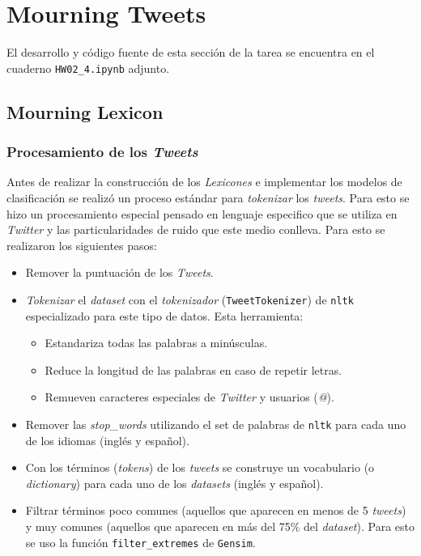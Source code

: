 \newpage

\section{Mourning Tweets}

El desarrollo y código fuente de esta sección de la tarea se encuentra en el cuaderno \texttt{HW02\_4.ipynb} adjunto.

\subsection{Mourning Lexicon}

\subsubsection{Procesamiento de los \textit{Tweets}}

Antes de realizar la construcción de los \textit{Lexicones} e implementar los modelos de clasificación se realizó un proceso estándar para \textit{tokenizar} los \textit{tweets}. Para esto se hizo un procesamiento especial pensado en lenguaje especifico que se utiliza en \textit{Twitter} y las particularidades de ruido que este medio conlleva. Para esto se realizaron los siguientes pasos:

\begin{itemize}
    \item Remover la puntuación de los \textit{Tweets}.
    
    \item \textit{Tokenizar} el \textit{dataset} con el \textit{tokenizador} (\texttt{TweetTokenizer}) de \texttt{nltk} especializado para este tipo de datos. Esta herramienta:
    \begin{itemize}
        \item Estandariza todas las palabras a minúsculas.
        
        \item Reduce la longitud de las palabras en caso de repetir letras.
        
        \item Remueven caracteres especiales de \textit{Twitter} y usuarios (\textit{@}).
    \end{itemize}
    
    \item Remover las \textit{stop\_words} utilizando el set de palabras de \texttt{nltk} para cada uno de los idiomas (inglés y español).
    
    \item Con los términos (\textit{tokens}) de los \textit{tweets} se construye un vocabulario (o \textit{dictionary}) para cada uno de los \textit{datasets} (inglés y español). 
    
    \item Filtrar términos poco comunes (aquellos que aparecen en menos de 5 \textit{tweets}) y muy comunes (aquellos que aparecen en más del 75\% del \textit{dataset}). Para esto se uso la función \texttt{filter\_extremes} de \texttt{Gensim}. 
    
\end{itemize}

